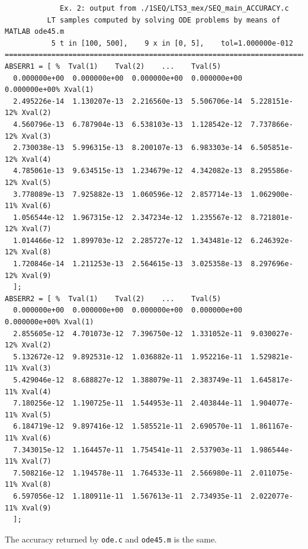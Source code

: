 \documentclass[a4paper,10pt]{report}%
\begin{document}
\begin{lstlisting}
             Ex. 2: output from ./1SEQ/LTS3_mex/SEQ_main_ACCURACY.c
          LT samples computed by solving ODE problems by means of MATLAB ode45.m
           5 t in [100, 500],    9 x in [0, 5],    tol=1.000000e-012
====================================================================================
ABSERR1 = [ %  Tval(1)    Tval(2)    ...    Tval(5)
  0.000000e+00  0.000000e+00  0.000000e+00  0.000000e+00  0.000000e+00% Xval(1)
  2.495226e-14  1.130207e-13  2.216560e-13  5.506706e-14  5.228151e-12% Xval(2)
  4.560796e-13  6.787904e-13  6.538103e-13  1.128542e-12  7.737866e-12% Xval(3)
  2.730038e-13  5.996315e-13  8.200107e-13  6.983303e-14  6.505851e-12% Xval(4)
  4.785061e-13  9.634515e-13  1.234679e-12  4.342082e-13  8.295586e-12% Xval(5)
  3.778089e-13  7.925882e-13  1.060596e-12  2.857714e-13  1.062900e-11% Xval(6)
  1.056544e-12  1.967315e-12  2.347234e-12  1.235567e-12  8.721801e-12% Xval(7)
  1.014466e-12  1.899703e-12  2.285727e-12  1.343481e-12  6.246392e-12% Xval(8)
  1.720846e-14  1.211253e-13  2.564615e-13  3.025358e-13  8.297696e-12% Xval(9)
  ];
ABSERR2 = [ %  Tval(1)    Tval(2)    ...    Tval(5)
  0.000000e+00  0.000000e+00  0.000000e+00  0.000000e+00  0.000000e+00% Xval(1)
  2.855605e-12  4.701073e-12  7.396750e-12  1.331052e-11  9.030027e-12% Xval(2)
  5.132672e-12  9.892531e-12  1.036882e-11  1.952216e-11  1.529821e-11% Xval(3)
  5.429046e-12  8.688827e-12  1.388079e-11  2.383749e-11  1.645817e-11% Xval(4)
  7.180256e-12  1.190725e-11  1.544953e-11  2.403844e-11  1.904077e-11% Xval(5)
  6.184719e-12  9.897416e-12  1.585521e-11  2.690570e-11  1.861167e-11% Xval(6)
  7.343015e-12  1.164457e-11  1.754541e-11  2.537903e-11  1.986544e-11% Xval(7)
  7.508216e-12  1.194578e-11  1.764533e-11  2.566980e-11  2.011075e-11% Xval(8)
  6.597056e-12  1.180911e-11  1.567613e-11  2.734935e-11  2.022077e-11% Xval(9)
  ];
\end{lstlisting}
The accuracy returned by {\tt ode.c} and {\tt ode45.m} is the same.
\end{document}
